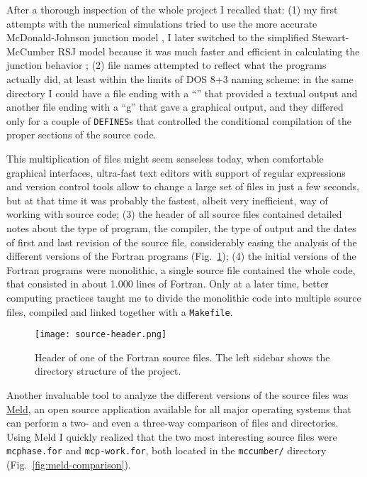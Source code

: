 After a thorough inspection of the whole project I recalled that:
(1) my first attempts with the numerical simulations tried to use the more accurate McDonald-Johnson junction model \cite{McDonald:1976}, I later switched to the simplified Stewart-McCumber RSJ model because it was much faster and efficient in calculating the junction behavior \cite{McCumber:1968, Stewart:1974};
(2) file names attempted to reflect what the programs actually did, at least within the limits of DOS 8+3 naming scheme: in the same directory I could have a file ending with a ``'' that provided a textual output and another file ending with a ``g'' that gave a graphical output, and they differed only for a couple of \texttt{DEFINES}s that controlled the conditional compilation of the proper sections of the source code.

This multiplication of files might seem senseless today, when comfortable graphical interfaces, ultra-fast text editors with support of regular expressions and version control tools allow to change a large set of files in just a few seconds, but at that time it was probably the fastest, albeit very inefficient, way of working with source code;
(3) the header of all source files contained detailed notes about the type of program, the compiler, the type of output and the dates of first and last revision of the source file, considerably easing the analysis of the different versions of the Fortran programs (Fig.~\ref{fig:source-header}); 
(4) the initial versions of the Fortran programs were monolithic, a single source file contained the whole code, that consisted in about 1.000 lines of Fortran. Only at a later time, better computing practices taught me to divide the monolithic code into multiple source files, compiled and linked together with a \texttt{Makefile}.

\begin{figure}[tb]
	\centering
	\texttt{[image: source-header.png]}
	\caption{Header of one of the Fortran source files. The left sidebar shows the directory structure of the project.}
	\label{fig:source-header}
\end{figure}


Another invaluable tool to analyze the different versions of the source files was \href{http://meldmerge.org/}{Meld}, an open source application available for all major operating systems that can perform a two- and even a three-way comparison of files and directories.
Using Meld I quickly realized that the two most interesting source files were \texttt{mcphase.for} and \texttt{mcp-work.for}, both located in the \texttt{mccumber/} directory  (Fig.~\ref{fig:meld-comparison}).

